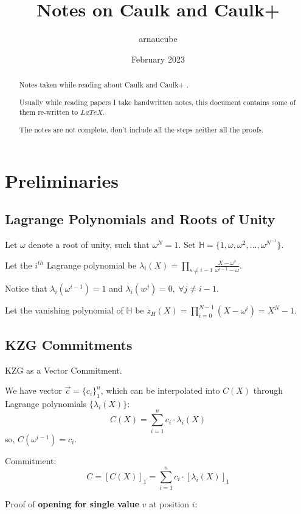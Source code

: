 \documentclass{article}
\title{Notes on Caulk and Caulk+}
\author{arnaucube}
\date{February 2023}
\theoremstyle{definition}
\begin{document}
\maketitle

\begin{abstract}
	Notes taken while reading about Caulk \cite{cryptoeprint:2022/621} and Caulk+ \cite{cryptoeprint:2022/957}.

	Usually while reading papers I take handwritten notes, this document contains some of them re-written to $LaTeX$.

	The notes are not complete, don't include all the steps neither all the proofs.
\end{abstract}

\tableofcontents

\section{Preliminaries}

\subsection{Lagrange Polynomials and Roots of Unity}

Let $\omega$ denote a root of unity, such that $\omega^N=1$. Set $\mathbb{H}=\{1, \omega, \omega^2, \ldots, \omega^{N^{-1}}\}$.

Let the $i^{th}$ Lagrange polynomial be $\lambda_i(X)=\prod_{s\neq i-1} \frac{X-\omega^s}{\omega^{i-1} -\omega}$.

Notice that $\lambda_i(\omega^{i-1})=1$ and $\lambda_i(w^j)=0,~\forall j\neq i-1$.

Let the vanishing polynomial of $\mathbb{H}$ be $z_H(X)=\prod_{i=0}^{N-1} (X - \omega^i) = X^N -1$.

\subsection{KZG Commitments}
KZG as a Vector Commitment.

We have vector $\overrightarrow{c}=\{c_i\}_1^n$, which can be interpolated into $C(X)$ through Lagrange polynomials $\{ \lambda_i(X) \}$:
$$C(X) = \sum^n_{i=1} c_i \cdot \lambda_i(X)$$
so, $C(\omega^{i-1})=c_i$.

Commitment:
$$C = [C(X)]_1 = \sum^n_{i=1} c_i \cdot [\lambda_i(X)]_1$$

Proof of \textbf{opening for single value} $v$ at position $i$:
\end{document}
